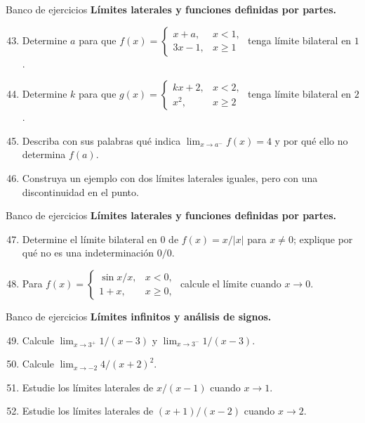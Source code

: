 \documentclass[12pt,aspectratio=169]{beamer}
\begin{document}
\begin{frame}[t,allowframebreaks]{Banco de ejercicios}
\small
\noindent \textbf{Límites laterales y funciones definidas por partes.}\par\smallskip
\begin{enumerate}\setcounter{enumi}{42}
\item Determine $a$ para que $f(x)=\begin{cases}x+a,&x<1,\\3x-1,&x\ge1\end{cases}$ tenga límite bilateral en $1$.
\item Determine $k$ para que $g(x)=\begin{cases}kx+2,&x<2,\\x^2,&x\ge2\end{cases}$ tenga límite bilateral en $2$.
\item Describa con sus palabras qué indica $\lim_{x\to a^-}f(x)=4$ y por qué ello no determina $f(a)$.
\item Construya un ejemplo con dos límites laterales iguales, pero con una discontinuidad en el punto.
\end{enumerate}
\end{frame}


\begin{frame}[t,allowframebreaks]{Banco de ejercicios}
\small
\noindent \textbf{Límites laterales y funciones definidas por partes.}\par\smallskip
\begin{enumerate}\setcounter{enumi}{46}
\item Determine el límite bilateral en $0$ de $f(x)=x/|x|$ para $x\ne0$; explique por qué no es una indeterminación $0/0$.
\item Para $f(x)=\begin{cases}\sin x/x,&x<0,\\1+x,&x\ge0,\end{cases}$ calcule el límite cuando $x\to0$.
\end{enumerate}
\end{frame}


\begin{frame}[t,allowframebreaks]{Banco de ejercicios}
\small
\noindent \textbf{Límites infinitos y análisis de signos.}\par\smallskip
\begin{enumerate}\setcounter{enumi}{48}
\item Calcule $\lim_{x\to3^+}1/(x-3)$ y $\lim_{x\to3^-}1/(x-3)$.
\item Calcule $\lim_{x\to-2}4/(x+2)^2$.
\item Estudie los límites laterales de $x/(x-1)$ cuando $x\to1$.
\item Estudie los límites laterales de $(x+1)/(x-2)$ cuando $x\to2$.
\end{enumerate}
\end{frame}
\end{document}
